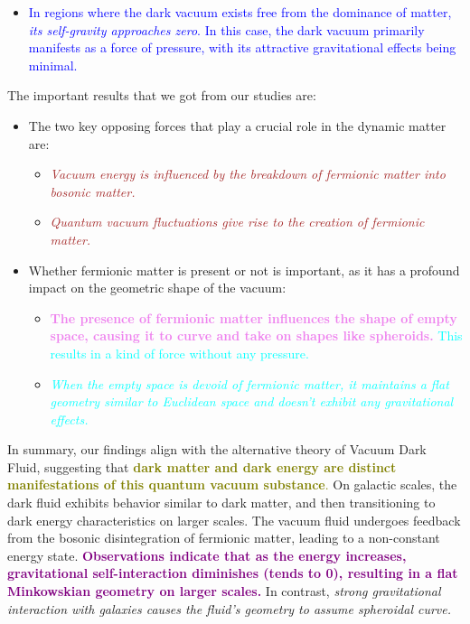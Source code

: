 \documentclass{sciposter}
\begin{document}
\begin{multicols}{3}
\begin{itemize}
\item \textcolor{blue}{In regions where the dark vacuum exists free from the dominance of matter, \textit{its self-gravity approaches zero}. In this case, the dark vacuum primarily manifests as a force of pressure, with its attractive gravitational effects being minimal.}
\end{itemize}
The important results that we got from our studies are:
\begin{itemize}
    \item The two key opposing forces that play a crucial role in the dynamic matter are: 
\begin{itemize}
   \item  \textcolor{brown}{\textit{Vacuum energy is influenced by the breakdown of fermionic matter into bosonic matter.}}
   \item \textcolor{brown}{\textit{Quantum vacuum fluctuations give rise to the creation of fermionic matter.}}
\end{itemize}
\item Whether fermionic matter is present or not is important, as it has a profound impact on the geometric shape of the vacuum:
\begin{itemize}
\item \textcolor{cyan}{\textbf{\textcolor{violet}{The presence of fermionic matter influences the shape of empty space, causing it to curve and take on shapes like spheroids.}} This results in a kind of force without any pressure.}
\item \textcolor{cyan}{\textit{When the empty space is devoid of fermionic matter, it maintains a flat geometry similar to Euclidean space and doesn't exhibit any gravitational effects.}}
\end{itemize}
\end{itemize}
In summary, our findings align with the alternative theory
of Vacuum Dark Fluid, suggesting that \textcolor{olive}{\textbf{dark matter and
dark energy are distinct manifestations of this quantum vacuum substance}.} On galactic scales, the dark fluid exhibits
behavior similar to dark matter, and then transitioning to
dark energy characteristics on larger scales. The vacuum
fluid undergoes feedback from the bosonic disintegration of
fermionic matter, leading to a non-constant energy state.
\textcolor{purple}{\textbf{Observations indicate that as the energy increases, gravitational self-interaction diminishes (tends to 0), resulting
in a flat Minkowskian geometry on larger scales.} }In contrast, \textit{strong gravitational interaction with galaxies causes
the fluid’s geometry to assume spheroidal curve.}
{}
\begin{thebibliography}{1}


\end{thebibliography}
\end{multicols}
\end{document}
